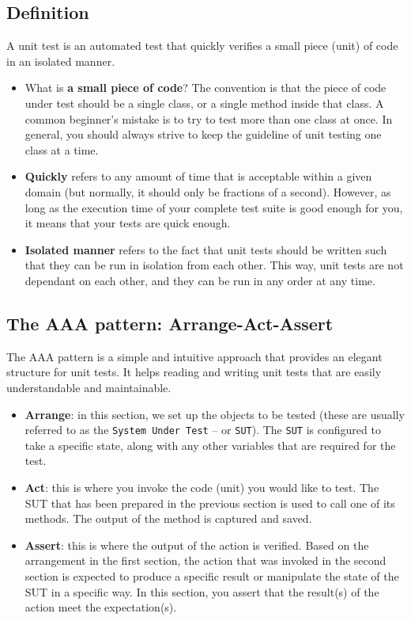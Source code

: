 \documentclass[
]{book}
\providecommand{\tightlist}{%
  \setlength{\itemsep}{0pt}\setlength{\parskip}{0pt}}
\begin{document}
\hypertarget{definition}{%
\subsection{Definition}\label{definition}}

A unit test is an automated test that quickly verifies a small piece (unit) of code in an isolated manner.

\begin{itemize}
\tightlist
\item
  What is \textbf{a small piece of code}? The convention is that the piece of code under test should be a single class, or a single method inside that class. A common beginner's mistake is to try to test more than one class at once. In general, you should always strive to keep the guideline of unit testing one class at a time.
\item
  \textbf{Quickly} refers to any amount of time that is acceptable within a given domain (but normally, it should only be fractions of a second). However, as long as the execution time of your complete test suite is good enough for you, it means that your tests are quick enough.
\item
  \textbf{Isolated manner} refers to the fact that unit tests should be written such that they can be run in isolation from each other. This way, unit tests are not dependant on each other, and they can be run in any order at any time.
\end{itemize}

\hypertarget{aaa}{%
\subsection{The AAA pattern: Arrange-Act-Assert}\label{aaa}}

The AAA pattern is a simple and intuitive approach that provides an elegant structure for unit tests. It helps reading and writing unit tests that are easily understandable and maintainable.

\begin{itemize}
\tightlist
\item
  \textbf{Arrange}: in this section, we set up the objects to be tested (these are usually referred to as the \texttt{System\ Under\ Test} -- or \texttt{SUT}). The \texttt{SUT} is configured to take a specific state, along with any other variables that are required for the test.
\item
  \textbf{Act}: this is where you invoke the code (unit) you would like to test. The SUT that has been prepared in the previous section is used to call one of its methods. The output of the method is captured and saved.
\item
  \textbf{Assert}: this is where the output of the action is verified. Based on the arrangement in the first section, the action that was invoked in the second section is expected to produce a specific result or manipulate the state of the SUT in a specific way. In this section, you assert that the result(s) of the action meet the expectation(s).
\end{itemize}
\end{document}
